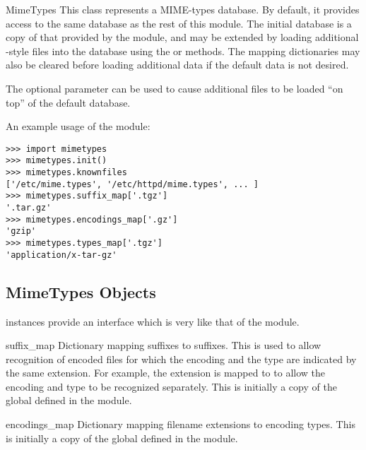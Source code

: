 \begin{classdesc}{MimeTypes}{}
  This class represents a MIME-types database.  By default, it
  provides access to the same database as the rest of this module.
  The initial database is a copy of that provided by the module, and
  may be extended by loading additional -style files
  into the database using the  or 
  methods.  The mapping dictionaries may also be cleared before
  loading additional data if the default data is not desired.

  The optional  parameter can be used to cause
  additional files to be loaded ``on top'' of the default database.

\end{classdesc}

An example usage of the module:

\begin{verbatim}
>>> import mimetypes
>>> mimetypes.init()
>>> mimetypes.knownfiles
['/etc/mime.types', '/etc/httpd/mime.types', ... ]
>>> mimetypes.suffix_map['.tgz']
'.tar.gz'
>>> mimetypes.encodings_map['.gz']
'gzip'
>>> mimetypes.types_map['.tgz']
'application/x-tar-gz'
\end{verbatim}

\subsection{MimeTypes Objects \label{mimetypes-objects}}

 instances provide an interface which is very like
that of the  module.

\begin{memberdesc}[MimeTypes]{suffix_map}
  Dictionary mapping suffixes to suffixes.  This is used to allow
  recognition of encoded files for which the encoding and the type are
  indicated by the same extension.  For example, the 
  extension is mapped to  to allow the encoding and type
  to be recognized separately.  This is initially a copy of the global
   defined in the module.
\end{memberdesc}

\begin{memberdesc}[MimeTypes]{encodings_map}
  Dictionary mapping filename extensions to encoding types.  This is
  initially a copy of the global  defined in the
  module.
\end{memberdesc}

